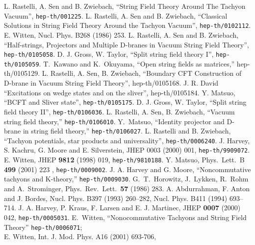 \documentclass[a4paper,12pt]{article}
\begin{document}
%

\begin{thebibliography}{99}
 L. Rastelli, A. Sen and B. Zwiebach,
``String Field Theory Around The Tachyon Vacuum'',
{\tt hep-th/001225}.
 L. Rastelli, A. Sen and B. Zwiebach,
``Classical Solutions in String Field Theory Around
the Tachyon Vacuum'', {\tt hep-th/0102112}.
 E. Witten, 
Nucl. Phys. B268 (1986) 253.
 L. Rastelli, A. Sen and B. Zwiebach,
``Half-strings, Projectors and Multiple D-branes in Vacuum String
Field Theory'', {\tt hep-th/0105058}.
 D. J. Gross, W. Taylor,
``Split string field theory I'', {\tt hep-th/0105059}.
 T.~Kawano and K.~Okuyama,
``Open string fields as matrices,''
hep-th/0105129.
 L. Rastelli, A. Sen, B. Zwiebach,
``Boundary CFT Construction of D-brane in Vacuum String
Field Theory'', hep-th/0105168.
 J. R. David 
``Excitations on wedge states and on the sliver'',
hep-th/0105184.
 Y. Matsuo, ``BCFT and Sliver state'',
{\tt hep-th/0105175}.
 D. J. Gross, W. Taylor,
``Split string field theory II'', {\tt hep-th/0106036}.
 L. Rastelli, A. Sen, B. Zwiebach,
``Vacuum string field theory,''
{\tt hep-th/0106010}.
Y.~Matsuo, ``Identity projector and D-brane in string field theory,''
{\tt hep-th/0106027}.
 L. Rastelli and B. Zwiebach, ``Tachyon
potentials, star products and universality'', {\tt hep-th/0006240}.
 J. Harvey, S. Kachru, G. Moore and E. Silverstein,
JHEP 0003 (2000) 001, {\tt  hep-th/9909072}.
 E. Witten, %
JHEP {\bf 9812} (1998) 019, {\tt hep-th/9810188}.
 Y. Matsuo, 
Phys.\ Lett.\ B {\bf 499} (2001) 223
, {\tt hep-th/0009002}.
 J. A. Harvey and G. Moore,
``Noncommutative tachyons and K-theory,''
{\tt hep-th/0009030}.
 G.~T.~Horowitz, J.~Lykken, R.~Rohm and A.~Strominger,
Phys.\ Rev.\ Lett.\  {\bf 57} (1986) 283.
 A. Abdurrahman, F. Anton and J. Bordes,
Nucl. Phys. B397 (1993) 260--282, Nucl. Phys. B411 (1994) 693--714.
 J. A. Harvey, P. Kraus, F. Larsen and E. J. Martinec,
JHEP {\bf 0007} (2000) 042, {\tt hep-th/0005031}.
 E.~Witten,
``Nonocommutative Tachyons and String Field Theory''
{\tt hep-th/0006071};\\
E. Witten, Int. J. Mod. Phys. A16 (2001) 693-706,

\end{thebibliography}
\end{document}
